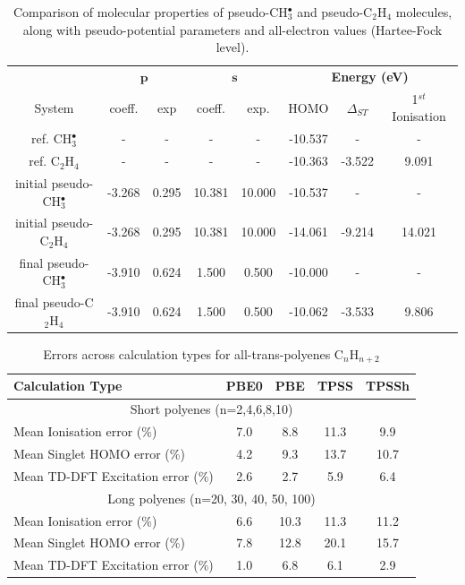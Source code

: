 \documentclass[12pt]{article}
\begin{document}
\begin{table}[h]
\caption{\label{table:potential_params} Comparison of molecular properties of pseudo-CH$^{\bullet}_{3}$ and pseudo-C$_{2}$H$_{4}$ molecules, along with pseudo-potential parameters and all-electron values (Hartee-Fock level).}
\begin{tabular}{| c | c | c | c | c | c | c | c| }
\hline
 & \multicolumn{2}{c}{\textbf{$\bm{p}$}} & \multicolumn{2}{c|}{$\bm{s}$} & \multicolumn{3}{c|}{\textbf{Energy (eV)}} \\
System & coeff. & exp & coeff. & exp. & HOMO & $\Delta_{ST}$ & 1$^{st}$ Ionisation \\
\hline
ref. CH$^{\bullet}_{3}$ & - & - & - & - & -10.537 & - & - \\
ref. C$_{2}$H$_{4}$ & - & - & - & - & -10.363 & -3.522 & 9.091 \\
\hline
initial pseudo-CH$^{\bullet}_{3}$ & -3.268 & 0.295 & 10.381 & 10.000 & -10.537 & - & - \\
initial pseudo-C$_{2}$H$_{4}$ & -3.268 & 0.295 & 10.381 & 10.000 & -14.061 & -9.214 & 14.021\\
\hline
final pseudo-CH$^{\bullet}_{3}$ & -3.910 & 0.624 & 1.500 & 0.500 & -10.000 & - & - \\
final pseudo-C$_{2}$H$_{4}$ & -3.910 & 0.624 & 1.500 & 0.500 & -10.062 & -3.533 & 9.806 \\
\hline
\end{tabular}
\end{table}


\newpage

\begin{table}[h]
\caption{Errors across calculation types for all-trans-polyenes C$_n$H$_{n+2}$}
\begin{tabular}{|l| c| c| c| c |}
\hline
\textbf{Calculation Type} & \textbf{PBE0} & \textbf{PBE} & \textbf{TPSS} & \textbf{TPSSh} \\
\hline
\multicolumn{5}{|c|}{Short polyenes (n=2,4,6,8,10)}\\
\hline
Mean Ionisation  error (\%) & 7.0 & 8.8 & 11.3 & 9.9 \\\hline
Mean Singlet HOMO  error (\%) & 4.2 & 9.3 & 13.7 & 10.7 \\\hline
Mean TD-DFT Excitation error (\%) & 2.6 & 2.7 & 5.9 & 6.4 \\ 
\hline
\multicolumn{5}{|c|}{Long polyenes (n=20, 30, 40, 50, 100)}\\
\hline
Mean Ionisation  error (\%) & 6.6 & 10.3 & 11.3 & 11.2 \\\hline
Mean Singlet HOMO  error (\%) & 7.8 & 12.8 & 20.1 & 15.7 \\\hline
Mean TD-DFT Excitation error (\%) & 1.0 & 6.8 & 6.1 & 2.9 \\
\hline
\end{tabular}
\label{table:alkene_errors}
\end{table}
\end{document}
